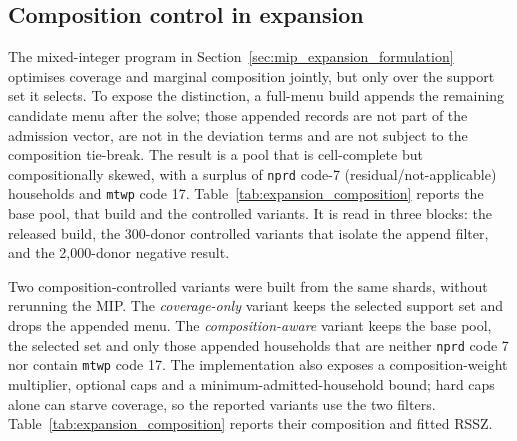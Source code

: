\subsection{Composition control in expansion}
\label{sec:expansion_composition}
The mixed-integer program in Section~\ref{sec:mip_expansion_formulation}
optimises coverage and marginal composition jointly, but only over the support
set it selects. To expose the distinction, a full-menu build appends the
remaining candidate menu after the solve; those appended records are not part of
the admission vector, are not in the deviation terms and are not subject to the
composition tie-break. The result is a pool that is cell-complete but
compositionally skewed, with a surplus of \texttt{nprd} code-7 (residual/not-applicable)
households and \texttt{mtwp} code 17. Table~\ref{tab:expansion_composition} reports the base pool, that
build and the controlled variants. It is read in three blocks: the released
build, the 300-donor controlled variants that isolate the append filter, and the
2{,}000-donor negative result.

Two composition-controlled variants were built from the same shards, without
rerunning the MIP. The \emph{coverage-only} variant keeps the selected support
set and drops the appended menu. The \emph{composition-aware} variant keeps the
base pool, the selected set and only those appended households that are neither
\texttt{nprd} code 7 nor contain \texttt{mtwp} code 17. The implementation also exposes a
composition-weight multiplier, optional caps and a minimum-admitted-household
bound; hard caps alone can starve coverage, so the reported variants use the two
filters. Table~\ref{tab:expansion_composition} reports their composition and
fitted RSSZ.


